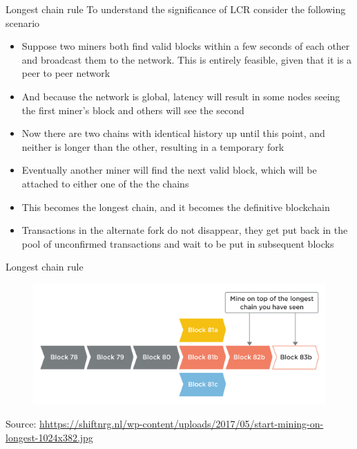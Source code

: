 \documentclass[9pt]{beamer}
\begin{document}

\begin{frame}{Longest chain rule}
	To understand the significance of LCR consider the following scenario
	\begin{itemize}
		\item Suppose two miners both find valid blocks within a few seconds of each other and broadcast them to the network. This is entirely feasible, given that it is a peer to peer network
		\item And because the network is global, latency will result in some nodes seeing the first miner's block and others will see the second
		\item Now there are two chains with identical history up until this point, and neither is longer than the other, resulting in a temporary fork
		\item Eventually another miner will find the next valid block, which will be attached to either one of the the chains
		\item This becomes the longest chain, and it becomes the definitive blockchain
		\item Transactions in the alternate fork do not disappear, they get put back in the pool of unconfirmed transactions and wait to be put in subsequent blocks
	\end{itemize}
\end{frame}


\begin{frame}{Longest chain rule}
	\begin{figure}[]
		\centering
		\includegraphics  [scale=0.5]{Images/lcr}
	\end{figure}
	\begin{tiny}
		Source: \href{https://shiftnrg.nl/docs/basic-knowledge/blockchain/what-are-blockchains-problems}{hhttps://shiftnrg.nl/wp-content/uploads/2017/05/start-mining-on-longest-1024x382.jpg}
	\end{tiny}
\end{frame}
\end{document}
